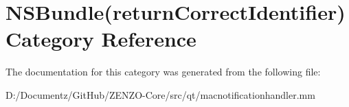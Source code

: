 \hypertarget{category_n_s_bundle_07return_correct_identifier_08}{}\section{N\+S\+Bundle(return\+Correct\+Identifier) Category Reference}
\label{category_n_s_bundle_07return_correct_identifier_08}


The documentation for this category was generated from the following file\+:\begin{DoxyCompactItemize}
\item 
D\+:/\+Documentz/\+Git\+Hub/\+Z\+E\+N\+Z\+O-\/\+Core/src/qt/macnotificationhandler.\+mm\end{DoxyCompactItemize}

